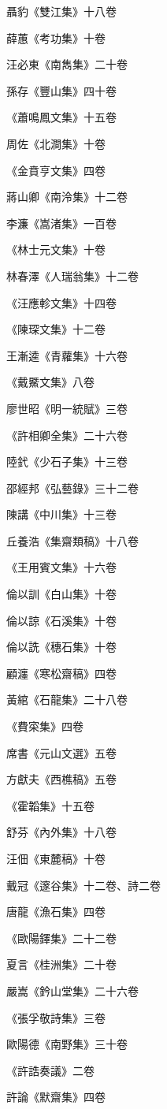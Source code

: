聶豹《雙江集》十八卷

薛蕙《考功集》十卷

汪必東《南雋集》二十卷

孫存《豐山集》四十卷

《蕭鳴鳳文集》十五卷

周佐《北澗集》十卷

《金賁亨文集》四卷

蔣山卿《南泠集》十二卷

李濂《嵩渚集》一百卷

《林士元文集》十卷

林春澤《人瑞翁集》十二卷

《汪應軫文集》十四卷

《陳琛文集》十二卷

王漸逵《青蘿集》十六卷

《戴鱀文集》八卷

廖世昭《明一統賦》三卷

《許相卿全集》二十六卷

陸釴《少石子集》十三卷

邵經邦《弘藝錄》三十二卷

陳講《中川集》十三卷

丘養浩《集齋類稿》十八卷

《王用賓文集》十六卷

倫以訓《白山集》十卷

倫以諒《石溪集》十卷

倫以詵《穗石集》十卷

顧瀍《寒松齋稿》四卷

黃綰《石龍集》二十八卷

《費寀集》四卷

席書《元山文選》五卷

方獻夫《西樵稿》五卷

《霍韜集》十五卷

舒芬《內外集》十八卷

汪佃《東麓稿》十卷

戴冠《邃谷集》十二卷、詩二卷

唐龍《漁石集》四卷

《歐陽鐸集》二十二卷

夏言《桂洲集》二十卷

嚴嵩《鈐山堂集》二十六卷

《張孚敬詩集》三卷

歐陽德《南野集》三十卷

《許誥奏議》二卷

許論《默齋集》四卷

